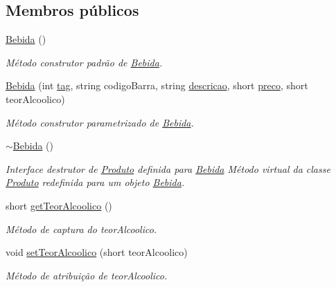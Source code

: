 \subsection*{Membros públicos}
\begin{DoxyCompactItemize}
\item 
\hypertarget{classBebida_afab3bc3b54a7e55049ed36fae3479dfb}{\hyperlink{classBebida_afab3bc3b54a7e55049ed36fae3479dfb}{Bebida} ()}\label{classBebida_afab3bc3b54a7e55049ed36fae3479dfb}

\begin{DoxyCompactList}\small\item\em Método construtor padrão de \hyperlink{classBebida}{Bebida}. \end{DoxyCompactList}\item 
\hyperlink{classBebida_a4f8e4f45e2b42c62591193127c7c0ea5}{Bebida} (int \hyperlink{classProduto_a76711f92305c825f07549734cd7c6ade}{tag}, string codigo\-Barra, string \hyperlink{classProduto_ab04a024e24feb7f79774e280356f6bc7}{descricao}, short \hyperlink{classProduto_a2ad13f91582fd70e878fc449c7b77171}{preco}, short teor\-Alcoolico)
\begin{DoxyCompactList}\small\item\em Método construtor parametrizado de \hyperlink{classBebida}{Bebida}. \end{DoxyCompactList}\item 
\hypertarget{classBebida_a4ed0a8b2b0b464f2b39ef81a01e297ad}{\hyperlink{classBebida_a4ed0a8b2b0b464f2b39ef81a01e297ad}{$\sim$\-Bebida} ()}\label{classBebida_a4ed0a8b2b0b464f2b39ef81a01e297ad}

\begin{DoxyCompactList}\small\item\em Interface destrutor de \hyperlink{classProduto}{Produto} definida para \hyperlink{classBebida}{Bebida}  Método virtual da classe \hyperlink{classProduto}{Produto} redefinida para um objeto \hyperlink{classBebida}{Bebida}. \end{DoxyCompactList}\item 
short \hyperlink{classBebida_a12416f60ae201da672ab9cd950d2fa70}{get\-Teor\-Alcoolico} ()
\begin{DoxyCompactList}\small\item\em Método de captura do teor\-Alcoolico. \end{DoxyCompactList}\item 
void \hyperlink{classBebida_afa75fe87caa8ede5d41edfb0dab031f2}{set\-Teor\-Alcoolico} (short teor\-Alcoolico)
\begin{DoxyCompactList}\small\item\em Método de atribuição de teor\-Alcoolico. \end{DoxyCompactList}\end{DoxyCompactItemize}
